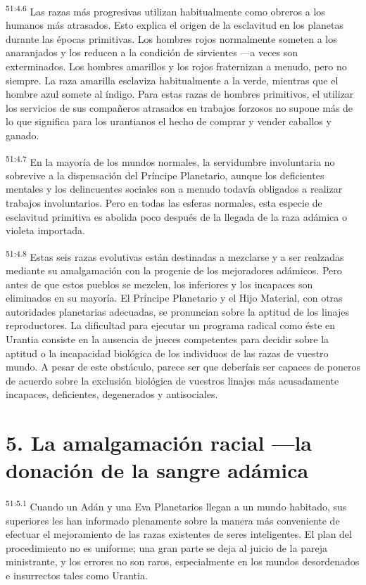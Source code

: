 \par
\textsuperscript{51:4.6} Las razas más progresivas utilizan habitualmente como obreros a los humanos más atrasados. Esto explica el origen de la esclavitud en los planetas durante las épocas primitivas. Los hombres rojos normalmente someten a los anaranjados y los reducen a la condición de sirvientes ---a veces son exterminados. Los hombres amarillos y los rojos fraternizan a menudo, pero no siempre. La raza amarilla esclaviza habitualmente a la verde, mientras que el hombre azul somete al índigo. Para estas razas de hombres primitivos, el utilizar los servicios de sus compañeros atrasados en trabajos forzosos no supone más de lo que significa para los urantianos el hecho de comprar y vender caballos y ganado.

\par
\textsuperscript{51:4.7} En la mayoría de los mundos normales, la servidumbre involuntaria no sobrevive a la dispensación del Príncipe Planetario, aunque los deficientes mentales y los delincuentes sociales son a menudo todavía obligados a realizar trabajos involuntarios. Pero en todas las esferas normales, esta especie de esclavitud primitiva es abolida poco después de la llegada de la raza adámica o violeta importada.

\par
\textsuperscript{51:4.8} Estas seis razas evolutivas están destinadas a mezclarse y a ser realzadas mediante su amalgamación con la progenie de los mejoradores adámicos. Pero antes de que estos pueblos se mezclen, los inferiores y los incapaces son eliminados en su mayoría. El Príncipe Planetario y el Hijo Material, con otras autoridades planetarias adecuadas, se pronuncian sobre la aptitud de los linajes reproductores. La dificultad para ejecutar un programa radical como éste en Urantia consiste en la ausencia de jueces competentes para decidir sobre la aptitud o la incapacidad biológica de los individuos de las razas de vuestro mundo. A pesar de este obstáculo, parece ser que deberíais ser capaces de poneros de acuerdo sobre la exclusión biológica de vuestros linajes más acusadamente incapaces, deficientes, degenerados y antisociales.

\section*{5. La amalgamación racial ---la donación de la sangre adámica}
\par
\textsuperscript{51:5.1} Cuando un Adán y una Eva Planetarios llegan a un mundo habitado, sus superiores les han informado plenamente sobre la manera más conveniente de efectuar el mejoramiento de las razas existentes de seres inteligentes. El plan del procedimiento no es uniforme; una gran parte se deja al juicio de la pareja ministrante, y los errores no son raros, especialmente en los mundos desordenados e insurrectos tales como Urantia.

